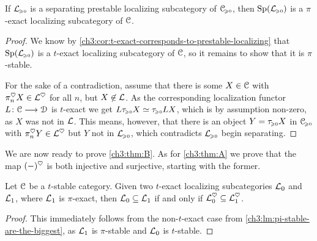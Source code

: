 \begin{lemma}
    \label{ch3:lm:separating-then-pi-exact}
    If $\mathcal{L}_{\hspace{-1pt}\scriptscriptstyle\geqslant 0}$ is a separating prestable localizing subcategory of $\EuScript{C}_{\hspace{-1pt}\scriptscriptstyle\geqslant 0}$, then $\mathrm{Sp}(\mathcal{L}_{\hspace{-1pt}\scriptscriptstyle\geqslant 0})$ is a $\pi$-exact localizing subcategory of $\EuScript{C}$. 
\end{lemma}
\begin{proof}
    We know by \cref{ch3:cor:t-exact-corresponds-to-prestable-localizing} that $\mathrm{Sp}(\mathcal{L}_{\hspace{-1pt}\scriptscriptstyle\geqslant 0})$ is a $t$-exact localizing subcategory of $\EuScript{C}$, so it remains to show that it is $\pi$-stable. 

    For the sake of a contradiction, assume that there is some $X\in \EuScript{C}$ with $\pi_n^\heartsuit X\in \mathcal{L}^\heartsuit$ for all $n$, but $X\not\in \mathcal{L}$. As the corresponding localization functor $L\colon\EuScript{C}\longrightarrow \EuScript{D}$ is $t$-exact we get $L\tau_{\hspace{-1pt}\scriptscriptstyle\geqslant 0} X \simeq \tau_{\hspace{-1pt}\scriptscriptstyle\geqslant 0} LX$, which is by assumption non-zero, as $X$ was not in $\mathcal{L}$. This means, however, that there is an object $Y=\tau_{\hspace{-1pt}\scriptscriptstyle\geqslant 0} X$ in $\EuScript{C}_{\hspace{-1pt}\scriptscriptstyle\geqslant 0}$ with $\pi_n^\heartsuit Y \in \mathcal{L}^\heartsuit$ but $Y$ not in $\mathcal{L}_{\hspace{-1pt}\scriptscriptstyle\geqslant 0}$, which contradicts $\mathcal{L}_{\hspace{-1pt}\scriptscriptstyle\geqslant 0}$ begin separating.  
\end{proof}









We are now ready to prove \cref{ch3:thm:B}. As for \cref{ch3:thm:A} we prove that the map $(-)^\heartsuit$ is both injective and surjective, starting with the former. 

\begin{lemma}
    \label{ch3:lm:pi-exact-are-the-biggest}
    Let $\EuScript{C}$ be a $t$-stable category. Given two $t$-exact localizing subcategories $\mathcal{L}_0$ and $\mathcal{L}_1$, where $\mathcal{L}_1$ is $\pi$-exact, then $\mathcal{L}_0 \subseteq \mathcal{L}_1$ if and only if $\mathcal{L}_0^\heartsuit \subseteq \mathcal{L}_1^\heartsuit$. 
\end{lemma}
\begin{proof}
    This immediately follows from the non-$t$-exact case from \cref{ch3:lm:pi-stable-are-the-biggest}, as $\mathcal{L}_1$ is $\pi$-stable and $\mathcal{L}_0$ is $t$-stable. 
\end{proof}


